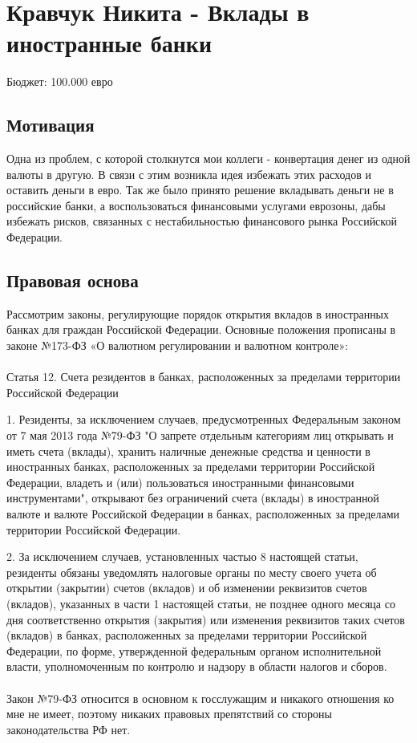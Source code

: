 \section{Кравчук Никита - Вклады в иностранные банки}
Бюджет: 100.000 евро \\

\subsection{Мотивация}
Одна из проблем, с которой столкнутся мои коллеги - конвертация денег из одной валюты в другую. В связи с этим возникла идея избежать этих расходов
и оставить деньги в евро. Так же было принято решение вкладывать деньги не в российские банки, а воспользоваться финансовыми услугами еврозоны, дабы избежать рисков, связанных с нестабильностью финансового рынка Российской Федерации. 

\subsection{Правовая основа}
Рассмотрим законы, регулирующие порядок открытия вкладов в иностранных банках для граждан Российской Федерации. Основные положения прописаны в законе №173-ФЗ «О валютном регулировании и валютном контроле»:
\\
\\
Статья 12. Счета резидентов в банках, расположенных за пределами территории Российской Федерации

1. Резиденты, за исключением случаев, предусмотренных Федеральным законом от 7 мая 2013 года №79-ФЗ "О запрете отдельным категориям лиц открывать и иметь счета (вклады), хранить наличные денежные средства и ценности в иностранных банках, расположенных за пределами территории Российской Федерации, владеть и (или) пользоваться иностранными финансовыми инструментами", открывают без ограничений счета (вклады) в иностранной валюте и валюте Российской Федерации в банках, расположенных за пределами территории Российской Федерации.

2. За исключением случаев, установленных частью 8 настоящей статьи, резиденты обязаны уведомлять налоговые органы по месту своего учета об открытии (закрытии) счетов (вкладов) и об изменении реквизитов счетов (вкладов), указанных в части 1 настоящей статьи, не позднее одного месяца со дня соответственно открытия (закрытия) или изменения реквизитов таких счетов (вкладов) в банках, расположенных за пределами территории Российской Федерации, по форме, утвержденной федеральным органом исполнительной власти, уполномоченным по контролю и надзору в области налогов и сборов.
\\
\\
Закон №79-ФЗ относится в основном к госслужащим и никакого отношения ко мне не имеет, поэтому никаких правовых препятствий со стороны законодательства РФ нет.

